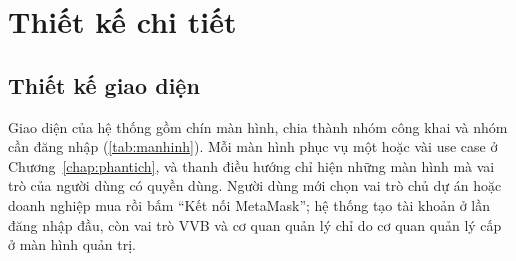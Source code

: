 \section{Thiết kế chi tiết}
\label{sec:tk-chitiet}

\subsection*{Thiết kế giao diện}
\label{subsec:tk-giaodien}

Giao diện của hệ thống gồm chín màn hình, chia thành nhóm công khai và nhóm cần đăng nhập (\autoref{tab:manhinh}). Mỗi màn hình phục vụ một hoặc vài use case ở Chương~\ref{chap:phantich}, và thanh điều hướng chỉ hiện những màn hình mà vai trò của người dùng có quyền dùng. Người dùng mới chọn vai trò chủ dự án hoặc doanh nghiệp mua rồi bấm ``Kết nối MetaMask''; hệ thống tạo tài khoản ở lần đăng nhập đầu, còn vai trò VVB và cơ quan quản lý chỉ do cơ quan quản lý cấp ở màn hình quản trị.

